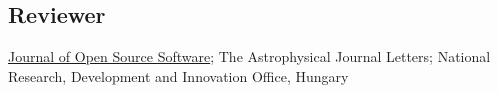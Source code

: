 \documentclass[margin]{res}
\begin{document}
\begin{resume}













\section{Reviewer}

\href{https://github.com/openjournals/joss-reviews/issues?utf8=✓&q=is\%3Aissue+benjaminrose+label\%3Areview}{Journal of Open Source Software}; The Astrophysical Journal Letters; National Research, Development and Innovation Office, Hungary











\end{resume}
\end{document}
